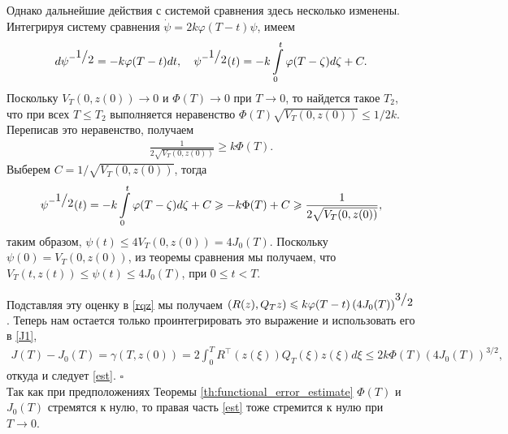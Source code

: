 \documentclass[../main.tex]{subfiles}
\begin{document}
Однако дальнейшие действия с системой сравнения здесь несколько изменены. 
Интегрируя систему сравнения $\dot{\psi} = 2k \varphi(T-t)\psi$, имеем
\begin{gather*}
    d\psi^{-\frc{1}{2}} = -k \varphi(T-t) dt, \quad
    \psi^{-\frc{1}{2}}(t) = -k \int\limits_0^t \varphi(T-\zeta) d\zeta + C.
\end{gather*}
Поскольку $V_T(0,z(0))\to 0$ и $\Phi(T) \to 0$ при $T\to 0$, то найдется такое   $T_2$, что при всех $T\leqslant T_2$ выполняется неравенство $\Phi(T) \sqrt{V_T(0,z(0))}  \leqslant 1/2k$. Переписав это неравенство, получаем
\begin{gather*}
	\frac{1}{2\sqrt{V_T(0,z(0))}} \geqslant k\Phi(T).
\end{gather*}  
Выберем $C = 1/\sqrt{V_T(0,z(0))}$, тогда
 \begin{gather*}
\psi^{-\frc{1}{2}}(t) = -k \int\limits_0^t \varphi(T-\zeta) d\zeta + C\geqslant -k\Phi(T)+C\geqslant \frac{1}{2\sqrt{V_T(0,z(0))}}, 
\end{gather*}  
таким образом, $\psi(t) \leqslant 4V_T(0,z(0))=4J_0(T)$. 
Поскольку $\psi(0)=V_T(0,z(0))$, из теоремы сравнения мы получаем, что $V_T(t,z(t))\leqslant \psi(t) \leqslant 4J_0(T)$, при $ 0\leqslant t <T$.

Подставляя эту оценку в  \eqref{rqz} мы получаем  $\left( R(z), Q_T z\right) \leqslant k \varphi(T-t) \left( 4J_0(T) \right) ^{\frc{3}{2}} $.
Теперь нам остается только проинтегрировать это выражение и использовать его в  \eqref{J1},
\begin{gather*}
J(T)-J_0(T)=		\gamma (T,z(0)) = 
		 2\int_{0}^{T}  R^{\top}(z(\xi))Q_T(\xi) z(\xi) d\xi\leqslant 2k \Phi(T) (4J_0(T))^{3/2}, 
\end{gather*}
откуда и следует \eqref{est}.
	\hfill $ \square $ \\
Так как при предположениях Теоремы \ref{th:functional_error_estimate}  $\Phi(T)$ и $J_0(T)$ стремятся к нулю, то правая часть  \eqref{est} тоже стремится к нулю при $T\to 0$.
\end{document}
